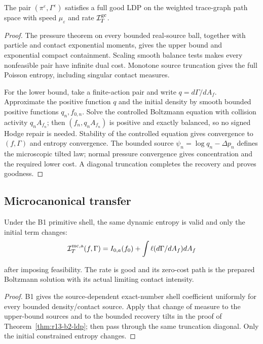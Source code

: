 \begin{theorem}
\label{thm:r13-b2-ldp}
The pair $(\pi^\varepsilon,\Gamma^\varepsilon)$ satisfies a full good LDP on
the weighted trace-graph path space with speed $\mu_\varepsilon$ and rate
$\mathcal I_T^{\rm gc}$.
\end{theorem}

\begin{proof}
The pressure theorem on every bounded real-source ball, together with particle
and contact exponential moments, gives the upper bound and exponential
compact containment.  Scaling smooth balance tests makes every nonfeasible
pair have infinite dual cost.  Monotone source truncation gives the full
Poisson entropy, including singular contact measures.

For the lower bound, take a finite-action pair and write
$q=d\Gamma/dA_f$.  Approximate the positive function $q$ and the initial
density by smooth bounded positive functions $q_n,f_{0,n}$.  Solve the
controlled Boltzmann equation with collision activity $q_nA_{f_n}$; then
$(f_n,q_nA_{f_n})$ is positive and exactly balanced, so no signed Hodge repair
is needed.  Stability of the controlled equation gives convergence to
$(f,\Gamma)$ and entropy convergence.  The bounded source
$\psi_n=\log q_n-\Delta p_n$ defines the microscopic tilted law; normal
pressure convergence gives concentration and the required lower cost.  A
diagonal truncation completes the recovery and proves goodness.
\end{proof}

\subsection{Microcanonical transfer}

\begin{theorem}
\label{thm:r13-b2-micro}
Under the B1 primitive shell, the same dynamic entropy is valid and only the
initial term changes:
\[
 \mathcal I_T^{\rm mc,a}(f,\Gamma)
 =I_{0,a}(f_0)+
 \int\ell(d\Gamma/dA_f)dA_f
\]

after imposing feasibility.  The rate is good and its zero-cost path is the
prepared Boltzmann solution with its actual limiting contact intensity.
\end{theorem}

\begin{proof}
B1 gives the source-dependent exact-number shell coefficient uniformly for
every bounded density/contact source.  Apply that change of measure to the
upper-bound sources and to the bounded recovery tilts in the proof of
Theorem~\ref{thm:r13-b2-ldp}; then pass through the same truncation diagonal.
Only the initial constrained entropy changes.
\end{proof}

